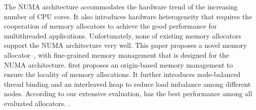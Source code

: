 The NUMA architecture accommodates the hardware trend of the increasing number of CPU cores. It also introduces hardware heterogeneity that requires the cooperation of memory allocators to achieve the good performance for multithreaded applications. Unfortunately, none of existing memory allocators support the NUMA architecture very well. 
This paper proposes a novel memory allocator--\NM{}, with fine-grained memory management that is designed for the NUMA architecture. \NM{} first proposes an origin-based memory management to ensure the locality of memory allocations. It further introduces node-balanced thread binding and an interleaved heap to reduce load imbalance among different nodes. 
According to our extensive evaluation, \NM{} has the best performance among all evaluated allocators. .
